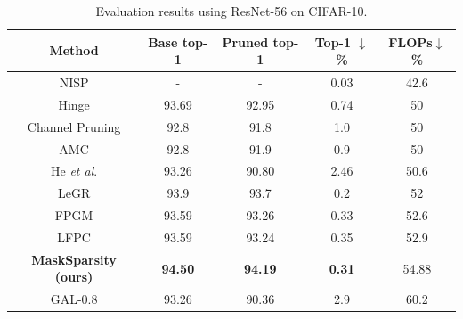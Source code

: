 \documentclass[review]{cvpr}
\begin{document}
\begin{table}[ht]\small
	\small\caption{Evaluation results using ResNet-56 on CIFAR-10.}

	\setlength{\tabcolsep}{0.01em}
	\begin{center}
		\begin{tabular}{ccccc}	
			\hline
			
			Method 							&Base top-1		&Pruned top-1	& Top-1 $\downarrow$\% 	&FLOPs$\downarrow$\%	 			\\
 			 \hline
			
		
			
		    NISP \cite{yu2018nisp}   &-         &-   &0.03 &42.6 \\
			
            Hinge \cite{Hinge}   &93.69        &92.95   &0.74            &50       \\
			Channel Pruning \cite{he2017channel}	&	92.8	&	91.8			&	1.0 	&	50		\\
			AMC \cite{he2018amc}					&	92.8	&	91.9			&	0.9		&	50		\\
			He \emph{et al}. \cite{he2017channel}    &93.26      &90.80   &2.46             &50.6       \\
			
			LeGR \cite{LeGR}   &93.9        &93.7   &0.2            &52 \\
			
			
			FPGM \cite{FPGM}						&	93.59	&93.26	&	0.33	&	52.6\\
			LFPC \cite{he2020learning}				&	93.59	&93.24	&	0.35	&	52.9\\
			\textbf{MaskSparsity (ours)}			&	\textbf{94.50}	&	\textbf{94.19}	&\textbf{0.31}	& 54.88	\\	
			GAL-0.8 \cite{GAL}   &93.26      &90.36     &2.9         &60.2  \\
			

\end{tabular}
\end{center}
\end{table}
\end{document}
